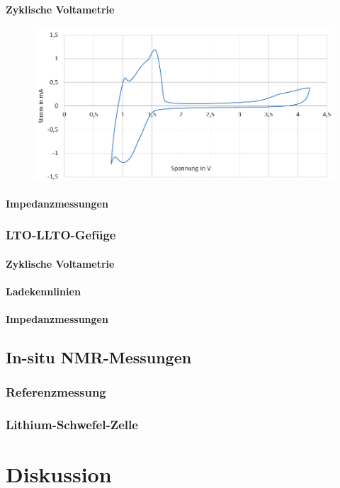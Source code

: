 \documentclass[a4paper, 11pt, headsepline,footsepline,twoside,abstract]{scrbook}
\begin{document}
\subsubsection{Zyklische Voltametrie}
\begin{figure}
	\centering
	\includegraphics[width=0.85\columnwidth]{images/CV_LLTO.jpg}
	\caption{}
	\label{cv_LLTO}
\end{figure}
\subsubsection{Impedanzmessungen}
\newpage
\subsection{LTO-LLTO-Gefüge}
\subsubsection{Zyklische Voltametrie}
\subsubsection{Ladekennlinien}
\subsubsection{Impedanzmessungen}
\newpage
\section{In-situ NMR-Messungen}
\subsection{Referenzmessung}
\subsection{Lithium-Schwefel-Zelle}
\chapter{Diskussion}
\end{document}
